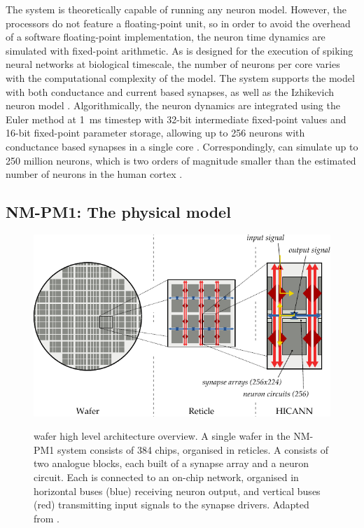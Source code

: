 The system is theoretically capable of running any neuron model. However, the processors do not feature a floating-point unit, so in order to avoid the overhead of a software floating-point implementation, the neuron time dynamics are simulated with fixed-point arithmetic. As \mbox{\NMMC} is designed for the execution of spiking neural networks at biological timescale, the number of neurons per core varies with the computational complexity of the model. The system supports the \LIF model with both conductance and current based synapses, as well as the Izhikevich neuron model \cite{hbp_neuromorphic_platform, izhikevich2004model}. Algorithmically, the \LIF neuron dynamics are integrated using the Euler method at \SI{1}{\milli\second} timestep with 32-bit intermediate fixed-point values and 16-bit fixed-point parameter storage, allowing up to 256 \LIF neurons with conductance based synapses in a single core \cite{rast2010leaky}. Correspondingly, \NMMC can simulate up to 250 million neurons, which is two orders of magnitude smaller than the estimated number of neurons in the human cortex \cite{braitenberg2013cortex}.

\subsection{NM-PM1: The physical model}

\begin{figure}
	\centering
	\vspace*{0.4cm}
	\includegraphics{media/chp2/nmpm1_sketch.pdf}\\
	\vspace*{0.4cm}
	\caption[NM-PM1 wafer high level architecture overview]{\NMPM wafer high level architecture overview. A single wafer in the NM-PM1 system consists of 384 \HICANN chips, organised in reticles. A \HICANN consists of two analogue blocks, each built of a synapse array and a neuron circuit. Each \HICANN is connected to an on-chip network, organised in horizontal buses (blue) receiving neuron output, and vertical buses (red) transmitting input signals to the synapse drivers. Adapted from \cite{petrovici2014characterization}.}
	\label{fig:nmpm1_sketch}
\end{figure}

